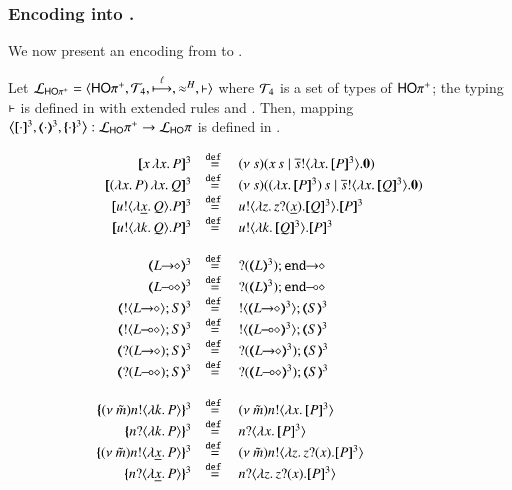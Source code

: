 \subsubsection{Encoding \HOpp into \HOp.}

We now present an encoding from \HOpp to \HOp.
%
\begin{definition}\rm
	\label{def:enc:HOpp_to_HOp}
	Let $\mathcal{L}_{\mathsf{HO}\pi^{\mathsf +}}=\langle \mathsf{HO}\pi^{\mathsf +}, {\cal{T}}_4, \stackrel{\ell}{\longmapsto}, \approx^{H}, \vdash \rangle$
where 
${\cal{T}}_4$ is a set of types of $\mathsf{HO}\pi^{\mathsf +}$;  
the typing $\vdash$ is defined in 
 with extended rules  and . 
Then, mapping $\enco{\pmap{\cdot}{3}, \tmap{\cdot}{3}, \mapa{\cdot}^{3}}: \tyl{L}_\HOpp \to \tyl{L}_\HOp$
	is defined in .
\end{definition}
%
\begin{figure}[t]
	\[
	\begin{array}{rcl}
		\pmap{\appl{x}{\abs{x} P}}{3} &\defeq& \newsp{s}{\appl{x}{s} \Par \bout{\dual{s}}{\abs{x} \pmap{P}{3}} \inact}
		\\
		\pmap{\appl{(\abs{x} P)}{\abs{x} Q}}{3} &\defeq& \newsp{s}{\appl{(\abs{x} \pmap{P}{3})}{s} \Par \bout{\dual{s}}{\abs{x} \pmap{Q}{3}} \inact}
		\\
		\pmap{\bout{u}{\abs{\underline{x}}{Q}} P}{3} &\defeq& \bout{u}{\abs{z}{\binp{z}{\underline{x}} \pmap{Q}{3}}} \pmap{P}{3}
		\\
		\pmap{\bout{u}{\abs{k}{Q}} P}{3} &\defeq& \bout{u}{\abs{k}{\pmap{Q}{3}}} \pmap{P}{3}
		\\
		\\
		\tmap{\shot{L}}{3} &\defeq& \shot{\btinp{\tmap{L}{3}} \tinact}
		\\
		\tmap{\lhot{L}}{3} &\defeq& \lhot{\btinp{\tmap{L}{3}} \tinact}
		\\
		\tmap{\btout{\shot{L}} S}{3} &\defeq& \btout{\tmap{\shot{L}}{3}} \tmap{S}{3}
		\\
		\tmap{\btout{\lhot{L}} S}{3} &\defeq& \btout{\tmap{\lhot{L}}{3}} \tmap{S}{3}
		\\
		\tmap{\btinp{\shot{L}} S}{3} &\defeq& \btinp{\tmap{\shot{L}}{3}} \tmap{S}{3}
		\\
		\tmap{\btinp{\lhot{L}} S}{3} &\defeq& \btinp{\tmap{\lhot{L}}{3}} \tmap{S}{3}
		\\
		\\
		\mapa{\news{\tilde{m}} \bactout{n}{\abs{k}{P}}}^{3} &\defeq& \news{\tilde{m}} \bactout{n}{\abs{x}{\pmap{P}{3}}}
		\\
		\mapa{\bactinp{n}{\abs{k}{P}}}^{3} &\defeq& \bactinp{n}{\abs{x}{\pmap{P}{3}}}
		\\
		\mapa{\news{\tilde{m}} \bactout{n}{\abs{\underline{x}}{P}}}^{3} &\defeq& \news{\tilde{m}} \bactout{n}{\abs{z}{\binp{z}{x} \pmap{P}{3}}}
		\\
		\mapa{\bactinp{n}{\abs{\underline{x}}{P}}}^{3} &\defeq& \bactinp{n}{\abs{z}{\binp{z}{x} \pmap{P}{3}}}


\end{array}\]
\end{figure}

